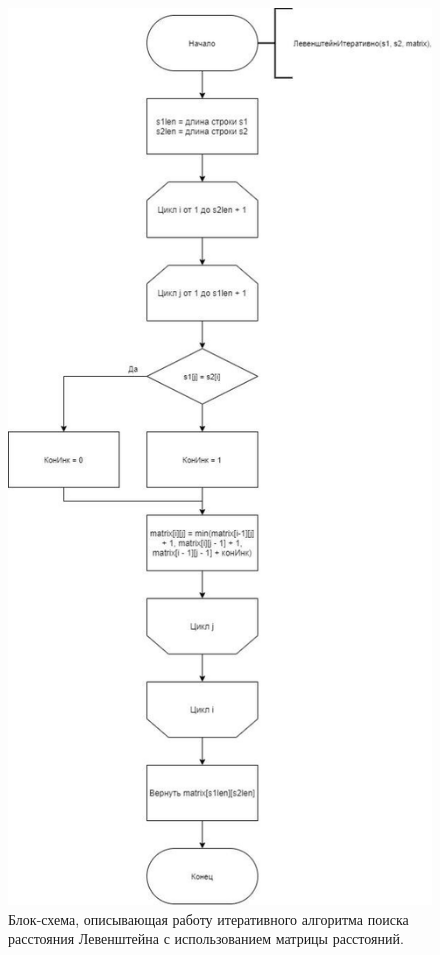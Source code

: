 \documentclass[12pt]{report}
\begin{document}
\begin{figure}
\begin{center}
\includegraphics[scale=0.5]{inc/img/LevIter.jpg}{}
\captionsetup{justification=centering}
	\caption{Блок-схема, описывающая работу итеративного алгоритма поиска расстояния Левенштейна с использованием матрицы расстояний.}
	\label{KC:3}

\end{center}
\end{figure}
\end{document}
